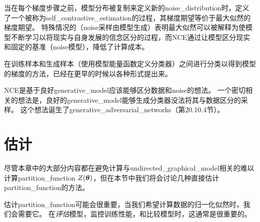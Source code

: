 当在每个梯度步骤之前，模型分布被复制来定义新的\gls{noise_distribution}时，定义了一个被称为\gls{self_contrastive_estimation}的过程，其梯度期望等价于最大似然的梯度期望\citep{Goodfellow-ICLR2015}。
特殊情况的（\gls{noise}采样由模型生成）表明最大似然可以被解释为使模型不断学习以将现实与自身发展的信念区分的过程，而\gls{NCE}通过让模型区分现实和固定的基准（\gls{noise}模型），降低了计算成本。


在训练样本和生成样本（使用模型能量函数定义分类器）之间进行分类以得到模型的梯度的方法，已经在更早的时候以各种形式提出来\citep{Welling2003b,Bengio-2009-book}。


\gls{NCE}是基于良好\gls{generative_model}应该能够区分数据和\gls{noise}的想法。
一个密切相关的想法是，良好的\gls{generative_model}能够生成分类器没法将其与数据区分的采样。
这个想法诞生了\gls{generative_adversarial_networks}（第20.10.4节）。


\section{估计}
\label{sec:estimating_the_partition_function}
尽管本章中的大部分内容都在避免计算与\gls{undirected_graphical_model}相关的难以计算\gls{partition_function} $Z(\boldsymbol{\theta})$，但在本节中我们将会讨论几种直接估计\gls{partition_function}的方法。


估计\gls{partition_function}可能会很重要，当我们希望计算数据的归一化似然时，我们会需要它。
在\emph{评估}模型，监控训练性能，和比较模型时，这通常是很重要的。


